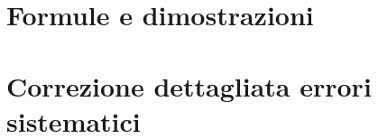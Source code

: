 \documentclass[12pt,a4paper]{article}
\begin{document}
\section{Formule e dimostrazioni}\label{sec:formule-e-dimostrazioni}

    

\section{Correzione dettagliata errori sistematici}\label{sec:correzione-dettagliata-errori-sistematici}

    
\end{document}
